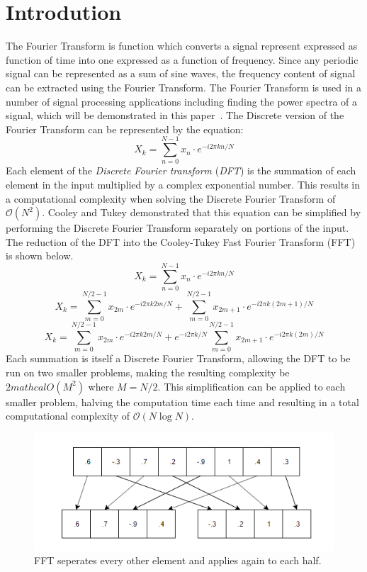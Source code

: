 \documentclass[sigconf]{acmart}
\begin{document}
\section{Introdution}
The Fourier Transform is function which converts a signal represent expressed as function of time into one expressed as a function of frequency. Since any periodic signal can be represented as a sum of sine waves, the frequency content of signal can be extracted using the Fourier Transform. The Fourier Transform is used in a number of signal processing applications including finding the power spectra of a signal, which will be demonstrated in this paper~\cite{PowerSpecta}.  The Discrete version of the Fourier Transform can be represented by the equation:
\[X_k = \sum_{n=0}^{N-1} x_n\cdot e^{-i2\pi k n/N}  \]
Each element of the \textit{Discrete Fourier transform} (\textit{DFT}) is the summation of each element in the input multiplied by a complex exponential number. This results in a computational complexity when solving the Discrete Fourier Transform of $\mathcal{O}(N^2)$. Cooley and Tukey demonstrated that this equation can be simplified by performing the Discrete Fourier Transform separately on portions of the input. The reduction of the DFT into the Cooley-Tukey Fast Fourier Transform (FFT) is shown below.
\[X_k = \sum_{n=0}^{N-1} x_n\cdot e^{-i2\pi k n/N}  \]
\[X_k = \sum_{m=0}^{N/2-1} x_{2m}\cdot e^{-i2\pi k 2m/N} + \sum_{m=0}^{N/2-1} x_{2m+1}\cdot e^{-i2\pi k (2m+1)/N}   \]
\[X_k = \sum_{m=0}^{N/2-1} x_{2m}\cdot e^{-i2\pi k 2m/N} + e^{-i2\pi k /N}\sum_{m=0}^{N/2-1} x_{2m+1}\cdot e^{-i2\pi k (2m)/N}   \]
Each summation is itself a Discrete Fourier Transform, allowing the DFT to be run on two smaller problems, making the resulting complexity be $2mathcal{O}(M^2)$ where $M = N/2$. This simplification can be applied to each smaller problem, halving the computation time each time and resulting in a total computational complexity of $\mathcal{O}(N\log{N})$.
\begin{figure}
    \includegraphics[scale=.6]{DiagramSeperate.PNG}
    \caption{FFT seperates every other element and applies again to each half.}
    \label{fig:my_label}
\end{figure}
\end{document}
